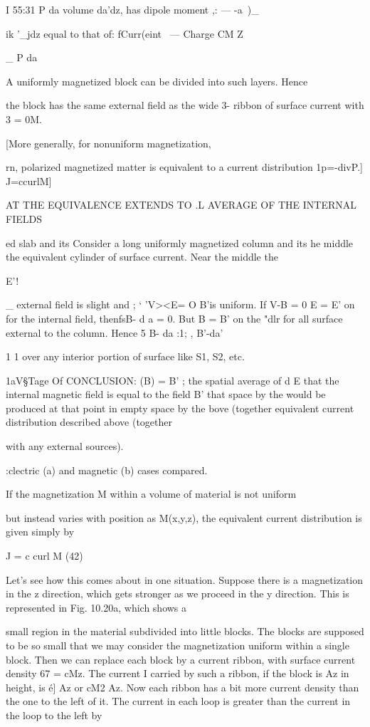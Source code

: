 {I 55:31 P da volume da'dz, has dipole moment ,: --- -a~)_

ik '_jdz equal to that of: fCurr(eint
\ --- Charge CM Z

_ P da 

A uniformly magnetized block can
be divided into such layers. Hence

the block has the
same external  
field as the wide  3-
ribbon of surface 
current with 3 = 0M.

[More generally, for nonuniform magnetization,

rn, polarized magnetized matter is equivalent to a current distribution
1p=-divP.] J=ccurlM]

      

{AT THE EQUIVALENCE EXTENDS TO
.L AVERAGE OF THE INTERNAL FIELDS

ed slab and its Consider a long uniformly magnetized column and its
he middle the equivalent cylinder of surface
current. Near the middle the

   
  

   

E'!

_ external field is slight and ;  ‘
'V><E= O B'is uniform. If V-B = 0 
E = E' on for the internal field, thenfsB- d a = 0. But B = B' on the
"dlr for all surface external to the column. Hence 5 B- da :1; , B'-da'

1 1
over any interior portion of surface like S1, S2, etc.

1aV§Tage Of CONCLUSION: (B) = B' ; the spatial average of
d E that the internal magnetic field is equal to the field B' that
space by the would be produced at that point in empty space by the
bove (together equivalent current distribution described above (together

with any external sources).

:clectric (a) and magnetic (b) cases compared.

If the magnetization M within a volume of material is not uniform

but instead varies with position as M(x,y,z), the equivalent current
distribution is given simply by

J = c curl M (42)

Let's see how this comes about in one situation. Suppose there is a
magnetization in the z direction, which gets stronger as we proceed
in the y direction. This is represented in Fig. 10.20a, which shows a

small region in the material subdivided into little blocks. The blocks
are supposed to be so small that we may consider the magnetization
uniform within a single block. Then we can replace each block by
a current ribbon, with surface current density 67 = cMz. The current
I carried by such a ribbon, if the block is Az in height, is é] Az
or cM2 Az. Now each ribbon has a bit more current density than
the one to the left of it. The current in each loop is greater than the
current in the loop to the left by

}}
